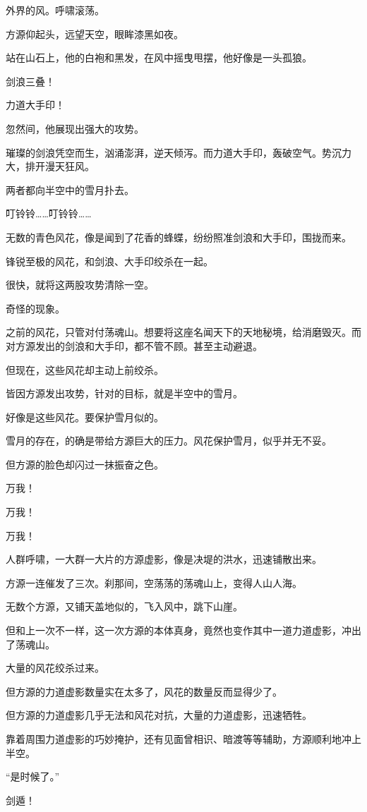 \begin{this_body}
外界的风。呼啸滚荡。

方源仰起头，远望天空，眼眸漆黑如夜。

站在山石上，他的白袍和黑发，在风中摇曳甩摆，他好像是一头孤狼。

剑浪三叠！

力道大手印！

忽然间，他展现出强大的攻势。

璀璨的剑浪凭空而生，汹涌澎湃，逆天倾泻。而力道大手印，轰破空气。势沉力大，排开漫天狂风。

两者都向半空中的雪月扑去。

叮铃铃……叮铃铃……

无数的青色风花，像是闻到了花香的蜂蝶，纷纷照准剑浪和大手印，围拢而来。

锋锐至极的风花，和剑浪、大手印绞杀在一起。

很快，就将这两股攻势清除一空。

奇怪的现象。

之前的风花，只管对付荡魂山。想要将这座名闻天下的天地秘境，给消磨毁灭。而对方源发出的剑浪和大手印，都不管不顾。甚至主动避退。

但现在，这些风花却主动上前绞杀。

皆因方源发出攻势，针对的目标，就是半空中的雪月。

好像是这些风花。要保护雪月似的。

雪月的存在，的确是带给方源巨大的压力。风花保护雪月，似乎并无不妥。

但方源的脸色却闪过一抹振奋之色。

万我！

万我！

万我！

人群呼啸，一大群一大片的方源虚影，像是决堤的洪水，迅速铺散出来。

方源一连催发了三次。刹那间，空荡荡的荡魂山上，变得人山人海。

无数个方源，又铺天盖地似的，飞入风中，跳下山崖。

但和上一次不一样，这一次方源的本体真身，竟然也变作其中一道力道虚影，冲出了荡魂山。

大量的风花绞杀过来。

但方源的力道虚影数量实在太多了，风花的数量反而显得少了。

但方源的力道虚影几乎无法和风花对抗，大量的力道虚影，迅速牺牲。

靠着周围力道虚影的巧妙掩护，还有见面曾相识、暗渡等等辅助，方源顺利地冲上半空。

“是时候了。”

剑遁！


\end{this_body}
